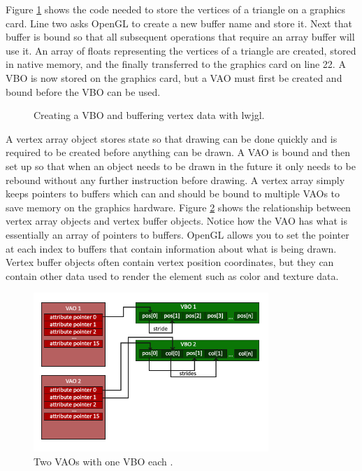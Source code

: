 \documentclass{article}
\begin{document}
Figure \ref{fig:create-vbo} shows the code needed to store the vertices of a triangle on a graphics card. Line two asks OpenGL to create a new buffer name and store it. Next that buffer is bound so that all subsequent operations that require an array buffer will use it. An array of floats representing the vertices of a triangle are created, stored in native memory, and the finally transferred to the graphics card on line 22. A VBO is now stored on the graphics card, but a VAO must first be created and bound before the VBO can be used.

\begin{figure}[h]
	
	\caption{Creating a VBO and buffering vertex data with lwjgl.}
	\label{fig:create-vbo}
\end{figure}

A vertex array object stores state so that drawing can be done quickly and is required to be created before anything can be drawn. A VAO is bound and then set up so that when an object needs to be drawn in the future it only needs to be rebound without any further instruction before drawing. A vertex array simply keeps pointers to buffers which can and should be bound to multiple VAOs to save memory on the graphics hardware. Figure \ref{fig:vbo-vao-ebo} shows the relationship between vertex array objects and vertex buffer objects. Notice how the VAO has what is essentially an array of pointers to buffers. OpenGL allows you to set the pointer at each index to buffers that contain information about what is being drawn. Vertex buffer objects often contain vertex position coordinates, but they can contain other data used to render the element such as color and texture data.

\begin{figure}[h]
    \centering
	\includegraphics[height=6cm]{vao}
	\caption{Two VAOs with one VBO each \cite{devries2019}.}
	\label{fig:vbo-vao-ebo}
\end{figure}
\end{document}
